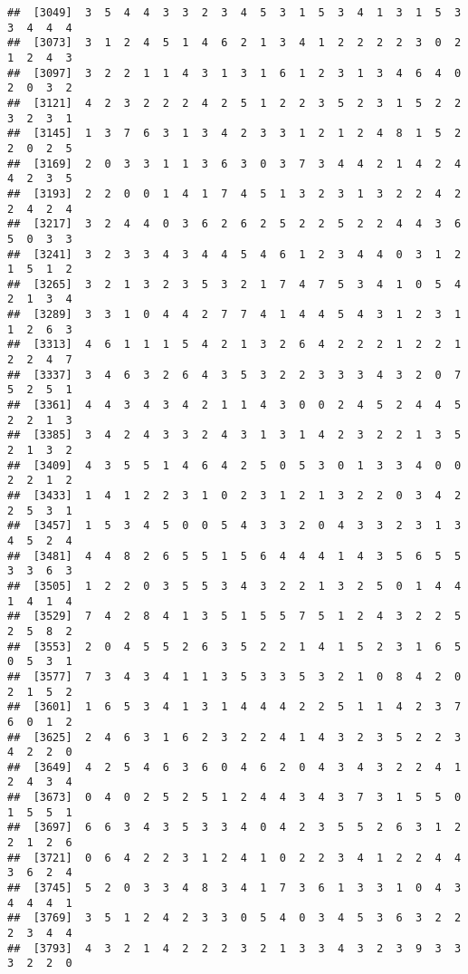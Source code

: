 \documentclass[
]{article}
\begin{document}
\begin{verbatim}
##  [3049]  3  5  4  4  3  3  2  3  4  5  3  1  5  3  4  1  3  1  5  3  3  4  4  4
##  [3073]  3  1  2  4  5  1  4  6  2  1  3  4  1  2  2  2  2  3  0  2  1  2  4  3
##  [3097]  3  2  2  1  1  4  3  1  3  1  6  1  2  3  1  3  4  6  4  0  2  0  3  2
##  [3121]  4  2  3  2  2  2  4  2  5  1  2  2  3  5  2  3  1  5  2  2  3  2  3  1
##  [3145]  1  3  7  6  3  1  3  4  2  3  3  1  2  1  2  4  8  1  5  2  2  0  2  5
##  [3169]  2  0  3  3  1  1  3  6  3  0  3  7  3  4  4  2  1  4  2  4  4  2  3  5
##  [3193]  2  2  0  0  1  4  1  7  4  5  1  3  2  3  1  3  2  2  4  2  2  4  2  4
##  [3217]  3  2  4  4  0  3  6  2  6  2  5  2  2  5  2  2  4  4  3  6  5  0  3  3
##  [3241]  3  2  3  3  4  3  4  4  5  4  6  1  2  3  4  4  0  3  1  2  1  5  1  2
##  [3265]  3  2  1  3  2  3  5  3  2  1  7  4  7  5  3  4  1  0  5  4  2  1  3  4
##  [3289]  3  3  1  0  4  4  2  7  7  4  1  4  4  5  4  3  1  2  3  1  1  2  6  3
##  [3313]  4  6  1  1  1  5  4  2  1  3  2  6  4  2  2  2  1  2  2  1  2  2  4  7
##  [3337]  3  4  6  3  2  6  4  3  5  3  2  2  3  3  3  4  3  2  0  7  5  2  5  1
##  [3361]  4  4  3  4  3  4  2  1  1  4  3  0  0  2  4  5  2  4  4  5  2  2  1  3
##  [3385]  3  4  2  4  3  3  2  4  3  1  3  1  4  2  3  2  2  1  3  5  2  1  3  2
##  [3409]  4  3  5  5  1  4  6  4  2  5  0  5  3  0  1  3  3  4  0  0  2  2  1  2
##  [3433]  1  4  1  2  2  3  1  0  2  3  1  2  1  3  2  2  0  3  4  2  2  5  3  1
##  [3457]  1  5  3  4  5  0  0  5  4  3  3  2  0  4  3  3  2  3  1  3  4  5  2  4
##  [3481]  4  4  8  2  6  5  5  1  5  6  4  4  4  1  4  3  5  6  5  5  3  3  6  3
##  [3505]  1  2  2  0  3  5  5  3  4  3  2  2  1  3  2  5  0  1  4  4  1  4  1  4
##  [3529]  7  4  2  8  4  1  3  5  1  5  5  7  5  1  2  4  3  2  2  5  2  5  8  2
##  [3553]  2  0  4  5  5  2  6  3  5  2  2  1  4  1  5  2  3  1  6  5  0  5  3  1
##  [3577]  7  3  4  3  4  1  1  3  5  3  3  5  3  2  1  0  8  4  2  0  2  1  5  2
##  [3601]  1  6  5  3  4  1  3  1  4  4  4  2  2  5  1  1  4  2  3  7  6  0  1  2
##  [3625]  2  4  6  3  1  6  2  3  2  2  4  1  4  3  2  3  5  2  2  3  4  2  2  0
##  [3649]  4  2  5  4  6  3  6  0  4  6  2  0  4  3  4  3  2  2  4  1  2  4  3  4
##  [3673]  0  4  0  2  5  2  5  1  2  4  4  3  4  3  7  3  1  5  5  0  1  5  5  1
##  [3697]  6  6  3  4  3  5  3  3  4  0  4  2  3  5  5  2  6  3  1  2  2  1  2  6
##  [3721]  0  6  4  2  2  3  1  2  4  1  0  2  2  3  4  1  2  2  4  4  3  6  2  4
##  [3745]  5  2  0  3  3  4  8  3  4  1  7  3  6  1  3  3  1  0  4  3  4  4  4  1
##  [3769]  3  5  1  2  4  2  3  3  0  5  4  0  3  4  5  3  6  3  2  2  2  3  4  4
##  [3793]  4  3  2  1  4  2  2  2  3  2  1  3  3  4  3  2  3  9  3  3  3  2  2  0

\end{verbatim}
\end{document}
